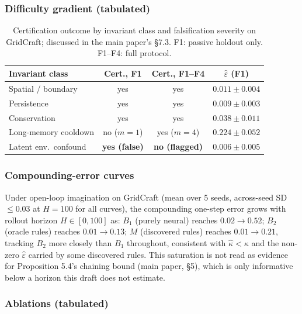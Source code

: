 \documentclass[11pt]{article}
\theoremstyle{plain}
\theoremstyle{definition}
\theoremstyle{remark}
\begin{document}
\subsubsection{Difficulty gradient (tabulated)}

\begin{table}[h]
\centering\small
\caption{Certification outcome by invariant class and falsification severity on GridCraft; discussed in the main paper's \S7.3. F1: passive holdout only. F1--F4: full protocol.}
\label{tab:gradient}
\begin{tabular}{@{}lccc@{}}
\toprule
Invariant class & Cert., F1 & Cert., F1--F4 & $\hat\varepsilon$ (F1) \\
\midrule
Spatial / boundary & yes & yes & $0.011\pm0.004$ \\
Persistence & yes & yes & $0.009\pm0.003$ \\
Conservation & yes & yes & $0.038\pm0.011$ \\
Long-memory cooldown & no ($m{=}1$) & yes ($m{=}4$) & $0.224\pm0.052$ \\
Latent env.\ confound & \textbf{yes (false)} & \textbf{no (flagged)} & $0.006\pm0.005$ \\
\bottomrule
\end{tabular}
\end{table}

\subsubsection{Compounding-error curves}

Under open-loop imagination on GridCraft (mean over 5 seeds, across-seed SD $\le0.03$ at $H=100$ for all curves), the compounding one-step error grows with rollout horizon $H\in[0,100]$ as: $B_1$ (purely neural) reaches $0.02\to0.52$; $B_2$ (oracle rules) reaches $0.01\to0.13$; $M$ (discovered rules) reaches $0.01\to0.21$, tracking $B_2$ more closely than $B_1$ throughout, consistent with $\hat\kappa<\kappa$ and the non-zero $\hat\varepsilon$ carried by some discovered rules. This saturation is not read as evidence for Proposition 5.4's chaining bound (main paper, \S5), which is only informative below a horizon this draft does not estimate.

\subsubsection{Ablations (tabulated)}
\end{document}
